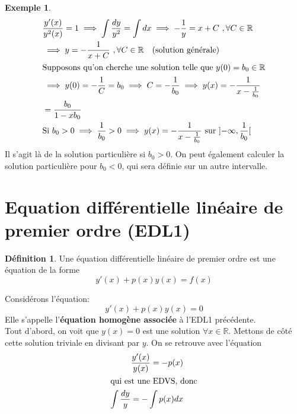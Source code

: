 \documentclass{article}
\theoremstyle{plain}
\theoremstyle{definition}
\newtheorem{defn}[thm]{Définition}
\newtheorem{exmp}[thm]{Exemple}
\theoremstyle{remark}
\begin{document}
\begin{exmp}
	\begin{align*}
		&\dfrac{y'(x)}{y^2(x)} = 1 \implies \int \dfrac{dy}{y^2} = \int dx \implies -\dfrac1y = x + C \ ,\forall C \in \mathbb{R} \\
		&\implies y = -\dfrac{1}{x + C} \ ,\forall C \in \mathbb{R} \quad \text{(solution générale)} \\
\intertext{Supposons qu'on cherche une solution telle que $y(0) = b_0 \in \mathbb{R}$}
		&\implies y(0) = -\dfrac1C = b_0 \implies C = -\dfrac{1}{b_0} \implies y(x) = -\dfrac{1}{x - \frac{1}{b_0}} \\
		&= \dfrac{b_0}{1 - xb_0} \\
		&\text{Si $b_0 > 0$}	\implies \dfrac{1}{b_0} > 0 \implies y(x) = -\dfrac{1}{x - \frac{1}{b_0}} \text{ sur } \mathopen]-\infty, \frac{1}{b_0}\mathclose[
	\end{align*}
Il s'agit là de la solution particulière si $b_0 > 0$. On peut également calculer la solution particulière pour $b_0 < 0$, qui sera définie sur un autre intervalle.
\end{exmp}


\section{Equation différentielle linéaire de premier ordre (EDL1)}
\begin{defn}
Une équation différentielle linéaire de premier ordre est une équation de la forme
	\begin{equation}
		y'(x) + p(x)y(x) = f(x)
	\end{equation}
\end{defn}

Considérons l'équation:
\begin{equation}
	y'(x) + p(x)y(x) = 0
\end{equation}
Elle s'appelle l'\textbf{équation homogène associée} à l'EDL1 précédente. \\
Tout d'abord, on voit que $y(x) = 0$ est une solution $\forall x \in \mathbb{R}$. Mettons de côté cette solution triviale en divisant par $y$. On se retrouve avec l'équation
\begin{align*}
	\dfrac{y'(x)}{y(x)} = -p(x) \\
\intertext{qui est une EDVS, donc}
	\int \dfrac{dy}{y} = -\int p(x)dx
\end{align*}
\end{document}
